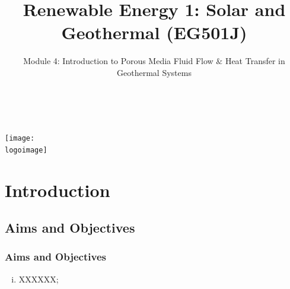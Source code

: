 \documentclass[10pt,compress]{beamer}
\institute{School of Engineering}
\title{Renewable Energy 1: Solar and Geothermal (EG501J)}
\subtitle{Module 4: Introduction to Porous Media Fluid Flow $\&$ Heat Transfer in Geothermal Systems}
\date[]{}
\author[\shortname]{%
  \fullname\\\ttfamily{\emailaddress}
}
\newcommand{\logoimage}{../FigBanner/UoAHorizBanner}
\begin{document}
\begin{frame}
  \titlepage
  \vfill%
  \begin{center}
    \texttt{[image: \\logoimage]}
  \end{center}
\end{frame}





\section{Introduction}

 \subsection{Aims and Objectives}
   \begin{frame}
     \frametitle{Aims and Objectives}
     \begin{enumerate}[(i)]
       \item <1-> XXXXXX;
 \end{enumerate}
   \end{frame}


\end{document}
